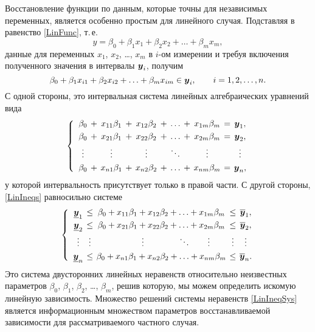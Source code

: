 \documentclass[a5paper,openany]{book}
\newcommand{\mbf}[1]{\protect\text{\boldmath$#1$}}
\newcommand{\ov}{\overline}
\newcommand{\un}{\underline}
\begin{document}
Восстановление функции по данным, которые точны для независимых переменных, является 
особенно простым для линейного случая. Подставляя в равенство \eqref{LinFunc}, т.\,е. 
\begin{equation*} 
y = \beta_{0} + \beta_{1} x_{1} + \beta_{2} x_{2} + \ldots + \beta_{m} x_{m}, 
\end{equation*} 
данные для переменных $x_1$, $x_2$, \ldots, $x_m$ в $i$-ом измерении и требуя 
включения полученного значения в интервалы $\mbf{y}_{i}$, получим 
\begin{equation} 
\label{LinIneqs} 
\beta_0 + \beta_1 x_{i1} + \beta_2 x_{i2} + \ldots + \beta_m x_{im} \in\mbf{y}_{i}, 
\qquad  i = 1,2,\ldots,n.  
\end{equation}  
С одной стороны, это интервальная система линейных алгебраических уравнений вида 
\begin{equation*} 
\arraycolsep=2pt 
\left\{ \ 
\begin{array}{ccccccccccc}
\beta_0 &+& x_{11}\beta_1 &+& 
   x_{12} \beta_2 &+& \ldots &+& x_{1m}\beta_m &=& \mbf{y}_{1}, \\[3pt] 
\beta_0 &+& x_{21}\beta_1 &+& 
   x_{22} \beta_2 &+& \ldots &+& x_{2m}\beta_m &=& \mbf{y}_{2}, \\[3pt] 
 \vdots &&  \vdots && \vdots && \ddots && \vdots && \vdots      \\[3pt] 
\beta_0 &+& x_{n1}\beta_1 &+& 
   x_{n2} \beta_2 &+& \ldots &+& x_{nm}\beta_m &=& \mbf{y}_{n}, 
\end{array} 
\right. 
\end{equation*} 
у которой интервальность присутствует только в правой части. С другой стороны, 
\eqref{LinIneqs} равносильно системе 
\begin{equation} 
\label{LinIneqSys} 
\arraycolsep=2pt 
\left\{ \ 
\begin{array}{ccccc}
\un{\mbf{y}}_{1} & \leq & \beta_0 + x_{11} \beta_1 + 
   x_{12} \beta_2 + \ldots + x_{1m} \beta_m & \leq & \ov{\mbf{y}}_{1}, \\[3pt] 
\un{\mbf{y}}_{2} & \leq & \beta_0 + x_{21} \beta_1 + 
   x_{22} \beta_2 + \ldots + x_{2m} \beta_m & \leq & \ov{\mbf{y}}_{2}, \\[3pt] 
 \vdots & \vdots & \hspace*{12mm} \vdots \qquad 
                         \qquad \ddots \qquad \vdots & \vdots & \vdots \\[3pt] 
\un{\mbf{y}}_{n} & \leq & \beta_0 + x_{n1} \beta_1 + 
   x_{n2} \beta_2 + \ldots + x_{nm} \beta_m & \leq & \ov{\mbf{y}}_{n}. 
\end{array} 
\right. 
\end{equation} 
Это система двусторонних линейных неравенств относительно неизвестных параметров 
$\beta_0$, $\beta_1$, $\beta_2$, \ldots, $\beta_m$, решив которую, мы можем определить 
искомую линейную зависимость. Множество решений системы неравенств \eqref{LinIneqSys} 
является информационным множеством параметров восстанавливаемой зависимости 
для рассматриваемого частного случая. 
  
\end{document}
